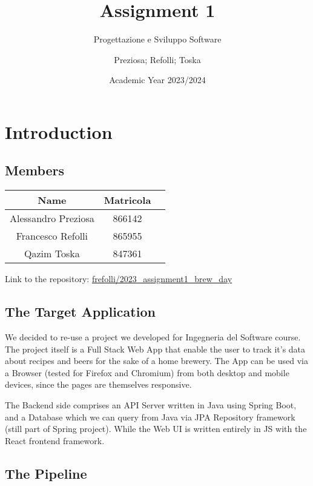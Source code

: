 \documentclass[a4paper,10pt]{scrartcl}
\title{Assignment 1}
\subtitle{Progettazione e Sviluppo Software}
\author{Preziosa; Refolli; Toska}
\date{Academic Year 2023/2024}
\begin{document}
\maketitle

\section{Introduction}

\subsection{Members}

\begin{center}
    \begin{tabular}{|c|c|c|}
        \hline
        Name & Matricola \\
        \hline
        Alessandro Preziosa & 866142 \\
        \hline
        Francesco Refolli & 865955 \\
        \hline
        Qazim Toska & 847361 \\
        \hline
    \end{tabular}
\end{center}

Link to the repository: \href{https://gitlab.com/frefolli/2023_assignment1_brew_day}{frefolli/2023\_assignment1\_brew\_day}

\subsection{The Target Application}

We decided to re-use a project we developed for Ingegneria del Software course. The project itself is a Full Stack Web App that enable the user to track it's data about recipes and beers for the sake of a home brewery. The App can be used via a Browser (tested for Firefox and Chromium) from both desktop and mobile devices, since the pages are themselves responsive.

The Backend side comprises an API Server written in Java using Spring Boot, and a Database which we can query from Java via JPA Repository framework (still part of Spring project). While the Web UI is written entirely in JS with the React frontend framework.

\subsection{The Pipeline}
\end{document}
